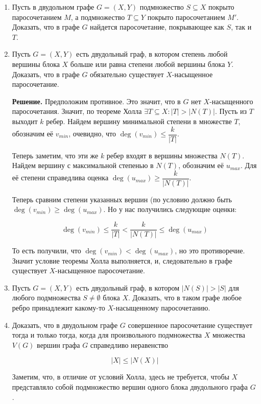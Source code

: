 \documentclass[fleqn]{article}
\begin{document}
	\begin{enumerate}
	\item Пусть в двудольном графе $G = (X, Y)$ подмножество $S \subseteq X$ покрыто паросочетанием $M$, а подмножество $T \subseteq Y$ покрыто паросочетанием $M'$. Доказать, что в графе $G$ найдется паросочетание, покрывающее как $S$, так и $T$.
	
	\item Пусть $G = (X, Y)$ есть двудольный граф, в котором степень любой вершины блока $X$ больше или равна степени любой вершины блока $Y$. Доказать, что в графе $G$ обязательно существует $X$-насыщенное паросочетание.
	
	\textbf{Решение.} Предположим противное. Это значит, что в $G$ нет $X$-насыщенного паросочетания. Значит, по теореме Холла $\exists T \subseteq X : |T| > |N(T)|$. Пусть из $T$ выходит $k$ ребер. Найдем вершину минимальной степени в множестве $T$, обозначим её $v_{min}$, очевидно, что $\deg(v_{min}) \leqslant \dfrac{k}{|T|}$.
	
	Теперь заметим, что эти же $k$ ребер входят в вершины множества $N(T)$. Найдем вершину с максимальной степенью в $N(T)$, обозначим её $u_{max}$. Для её степени справедлива оценка $\deg(u_{max}) \geqslant \dfrac{k}{|N(T)|}$.
	
	Теперь сравним степени указанных вершин (по условию должно быть $\deg(v_{min}) \geqslant \deg(u_{max})$. Но у нас получились следующие оценки:
	
	$$\deg(v_{min}) \leqslant \frac{k}{|T|} < \frac{k}{|N(T)|} \leqslant \deg(u_{max})$$
	
	То есть получили, что $\deg(v_{min}) < \deg(u_{max})$, но это противоречие. Значит условие теоремы Холла выполняется, и, следовательно в графе существует $X$-насыщенное паросочетание.
	
	\item Пусть $G = (X, Y)$ есть двудольный граф, в котором $|N(S)| > |S|$ для любого подмножества $S \neq \emptyset$	блока $X$. Доказать, что в таком графе любое ребро принадлежит какому-то $X$-насыщенному паросочетанию.
	
	\item Доказать, что в двудольном графе $G$ совершенное паросочетание существует тогда и только тогда,
	когда для произвольного подмножества $X$ множества $V(G)$ вершин графа $G$ справедливо неравенство
	
	$$|X| \leqslant |N(X)|$$
	
	Заметим, что, в отличие от условий Холла, здесь не требуется, чтобы $X$ представляло собой
	подмножество вершин одного блока двудольного графа $G$.
	\end{enumerate}
	
	
\end{document}
